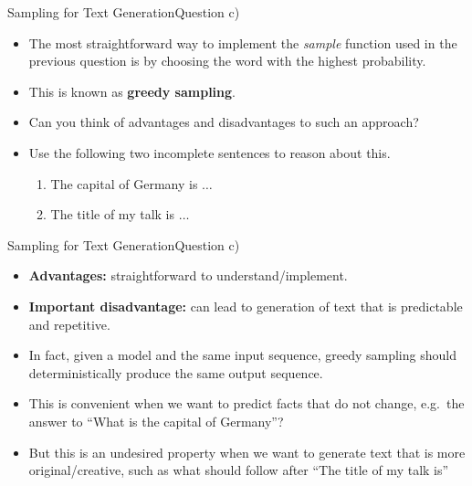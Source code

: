 \documentclass[t]{beamer}
\begin{document}
\begin{frame}{Sampling for Text Generation}{Question c)}
    \begin{itemize}
        \item The most straightforward way to implement the \emph{sample}
              function used in the previous question is by choosing the word
              with the highest probability.
        \item This is known as \textbf{greedy sampling}.
        \item Can you think of advantages and disadvantages to such an approach?
        \item Use the following two incomplete sentences to reason about this.
              \begin{enumerate}
                  \item The capital of Germany is $\ldots$
                  \item The title of my talk is $\ldots$
              \end{enumerate}
    \end{itemize}
\end{frame}

\begin{frame}{Sampling for Text Generation}{Question c)}
    \begin{itemize}
        \item \textbf{Advantages:} straightforward to understand/implement.
        \item \textbf{Important disadvantage:} can lead to generation of text
              that is predictable and repetitive.
        \item In fact, given a model and the same input sequence, greedy
              sampling should deterministically produce the same output
              sequence.
        \item This is convenient when we want to predict facts that do not
              change, e.g.\ the answer to ``What is the capital of Germany''?
        \item But this is an undesired property when we want to generate text
              that is more original/creative, such as what should follow after
              ``The title of my talk is''
    \end{itemize}
\end{frame}
\end{document}
